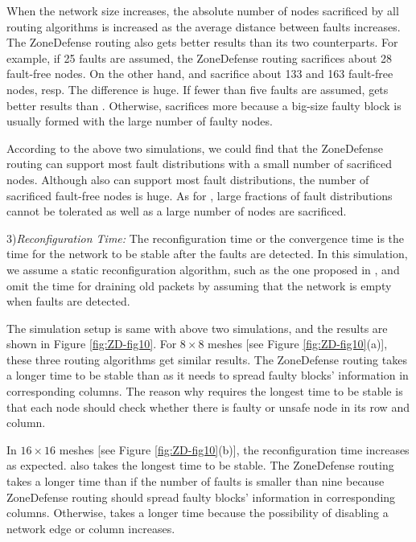 When the network size increases, the absolute number of nodes sacrificed by all routing algorithms is increased as the average distance between faults increases. The ZoneDefense routing also gets better results than its two counterparts. For example, if 25 faults are assumed, the ZoneDefense routing sacrifices about 28 fault-free nodes. On the other hand, \cite{wu2003fault} and \cite{zhang2008reconfigurable} sacrifice about 133 and 163 fault-free nodes, resp. The difference is huge. If fewer than five faults are assumed, \cite{zhang2008reconfigurable} gets better results than \cite{wu2003fault}. Otherwise, \cite{zhang2008reconfigurable} sacrifices more because a big-size faulty block is usually formed with the large number of faulty nodes.

According to the above two simulations, we could find that the ZoneDefense routing can support most fault distributions with a small number of sacrificed nodes. Although \cite{wu2003fault} also can support most fault distributions, the number of sacrificed fault-free nodes is huge. As for \cite{zhang2008reconfigurable}, large fractions of fault distributions cannot be tolerated as well as a large number of nodes are sacrificed.

3)\textit{Reconfiguration Time:} The reconfiguration time or the convergence time is the time for the network to be stable after the faults are detected. In this simulation, we assume a static reconfiguration algorithm, such as the one proposed in \cite{rodeheffer1991automatic}, and omit the time for draining old packets by assuming that the network is empty when faults are detected.

The simulation setup is same with above two simulations, and the results are shown in Figure \ref{fig:ZD-fig10}. For $8 \times 8$ meshes [see Figure \ref{fig:ZD-fig10}(a)], these three routing algorithms get similar results. The ZoneDefense routing takes a longer time to be stable than \cite{wu2003fault} as it needs to spread faulty blocks’ information in corresponding columns. The reason why \cite{zhang2008reconfigurable} requires the longest time to be stable is that each node should check whether there is faulty or unsafe node in its row and column.

In $16 \times 16$ meshes [see Figure \ref{fig:ZD-fig10}(b)], the reconfiguration time increases as expected. \cite{zhang2008reconfigurable} also takes the longest time to be stable. The ZoneDefense routing takes a longer time than \cite{wu2003fault} if the number of faults is smaller than nine because ZoneDefense routing should spread faulty blocks’ information in corresponding columns. Otherwise, \cite{wu2003fault} takes a longer time because the possibility of disabling a network edge or column increases.

